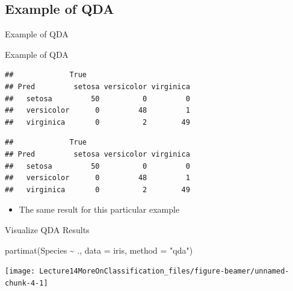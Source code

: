\documentclass[
  ignorenonframetext,
]{beamer}
\newenvironment{Shaded}{\begin{snugshade}}{\end{snugshade}}
\newcommand{\AttributeTok}[1]{\textcolor[rgb]{0.77,0.63,0.00}{#1}}
\newcommand{\FunctionTok}[1]{\textcolor[rgb]{0.00,0.00,0.00}{#1}}
\newcommand{\NormalTok}[1]{#1}
\newcommand{\OtherTok}[1]{\textcolor[rgb]{0.56,0.35,0.01}{#1}}
\newcommand{\SpecialCharTok}[1]{\textcolor[rgb]{0.00,0.00,0.00}{#1}}
\newcommand{\StringTok}[1]{\textcolor[rgb]{0.31,0.60,0.02}{#1}}
\providecommand{\tightlist}{%
  \setlength{\itemsep}{0pt}\setlength{\parskip}{0pt}}
\begin{document}
\hypertarget{example-of-qda}{%
\subsection{Example of QDA}\label{example-of-qda}}

\begin{frame}[fragile]{Example of QDA}
\begin{Shaded}
\end{Shaded}
\end{frame}

\begin{frame}[fragile]{Example of QDA}
\protect\hypertarget{example-of-qda-1}{}
\begin{verbatim}
##             True
## Pred         setosa versicolor virginica
##   setosa         50          0         0
##   versicolor      0         48         1
##   virginica       0          2        49
\end{verbatim}

\begin{verbatim}
##             True
## Pred         setosa versicolor virginica
##   setosa         50          0         0
##   versicolor      0         48         1
##   virginica       0          2        49
\end{verbatim}

\begin{itemize}
\tightlist
\item
  The same result for this particular example
\end{itemize}
\end{frame}

\begin{frame}[fragile]{Visualize QDA Results}
\protect\hypertarget{visualize-qda-results}{}
\begin{Shaded}
\begin{Highlighting}[]
\FunctionTok{partimat}\NormalTok{(Species }\SpecialCharTok{\textasciitilde{}}\NormalTok{ ., }\AttributeTok{data =}\NormalTok{ iris, }\AttributeTok{method =} \StringTok{"qda"}\NormalTok{)}
\end{Highlighting}
\end{Shaded}

\texttt{[image: Lecture14MoreOnClassification\_files/figure-beamer/unnamed-chunk-4-1]}
\end{frame}
\end{document}
